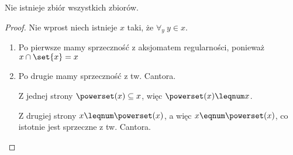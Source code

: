 \begin{theorem}
    Nie istnieje zbiór wszystkich zbiorów.
\end{theorem}
\begin{proof}
    Nie wprost niech istnieje \( x \) taki, że \( \forall_{y} \ y \in x \).
    \begin{enumerate}
        \item Po pierwsze mamy sprzeczność z aksjomatem regularności, ponieważ \( x \cap \set{x} = x \)
        \item Po drugie mamy sprzeczność z tw. Cantora.
        
            Z jednej strony \( \powerset(x) \subseteq x \), więc \( \powerset(x) \leqnum x \).
            
            Z drugiej strony \( x \leqnum \powerset(x) \), a więc \( x \eqnum \powerset(x) \), co istotnie jest sprzeczne z tw. Cantora.
    \end{enumerate}
\end{proof}